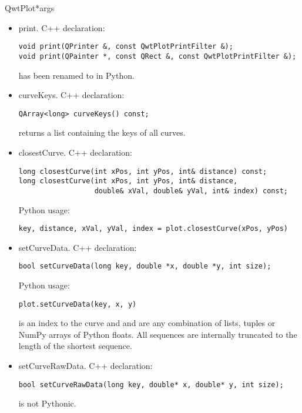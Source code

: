 \documentclass{manual}
\begin{document}
\begin{classdesc}{QwtPlot}{*args}

  \begin{itemize}

    \item{print}. C++ declaration:
      \begin{verbatim}
void print(QPrinter &, const QwtPlotPrintFilter &);
void print(QPainter *, const QRect &, const QwtPlotPrintFilter &);
      \end{verbatim}
       has been renamed to  in Python.

    \item{curveKeys}. C++ declaration:
      \begin{verbatim}
QArray<long> curveKeys() const;
      \end{verbatim}
       returns a list containing the keys of all curves.

    \item{closestCurve}. C++ declaration:
      \begin{verbatim}
long closestCurve(int xPos, int yPos, int& distance) const;
long closestCurve(int xPos, int yPos, int& distance,
                  double& xVal, double& yVal, int& index) const;
      \end{verbatim}
      Python usage:
      \begin{verbatim}
key, distance, xVal, yVal, index = plot.closestCurve(xPos, yPos)
      \end{verbatim}

    \item{setCurveData}. C++ declaration:
      \begin{verbatim}
bool setCurveData(long key, double *x, double *y, int size);
      \end{verbatim}
      Python usage:
      \begin{verbatim}
plot.setCurveData(key, x, y)
      \end{verbatim}
       is an index to the curve and  and  are any
      combination of lists, tuples or NumPy arrays of Python floats.
      All sequences are internally truncated to the length of the shortest
      sequence.

    \item{setCurveRawData}. C++ declaration:
      \begin{verbatim}
bool setCurveRawData(long key, double* x, double* y, int size);
      \end{verbatim}
       is not Pythonic.


\end{itemize}
\end{classdesc}
\end{document}
